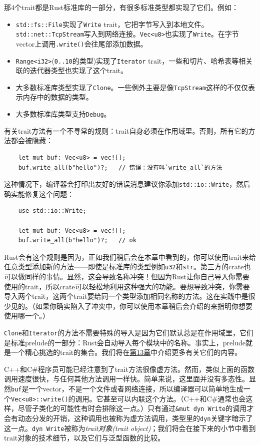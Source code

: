 那4个trait都是Rust标准库的一部分，有很多标准类型都实现了它们。例如：
\begin{itemize}
    \item \texttt{std::fs::File}实现了\texttt{Write} trait，它把字节写入到本地文件。\texttt{std::net::TcpStream}写入到网络连接。\texttt{Vec<u8>}也实现了\texttt{Write}。在字节vector上调用\texttt{.write()}会往尾部添加数据。
    \item \texttt{Range<i32>}(\texttt{0..10}的类型)实现了\texttt{Iterator} trait，一些和切片、哈希表等相关联的迭代器类型也实现了这个trait。
    \item 大多数标准库类型实现了\texttt{Clone}。一些例外主要是像\texttt{TcpStream}这样的不仅仅表示内存中的数据的类型。
    \item 大多数标准库类型支持\texttt{Debug}。
\end{itemize}

有关trait方法有一个不寻常的规则：trait自身必须在作用域里。否则，所有它的方法都会被隐藏：
\begin{verbatim}
    let mut buf: Vec<u8> = vec![];
    buf.write_all(b"hello")?;   // 错误：没有叫`write_all`的方法
\end{verbatim}

这种情况下，编译器会打印出友好的错误消息建议你添加\texttt{std::io::Write}，然后确实能修复这个问题：
\begin{verbatim}
    use std::io::Write;

    let mut buf: Vec<u8> = vec![];
    buf.write_all(b"hello")?;   // ok
\end{verbatim}

Rust会有这个规则是因为，正如我们稍后会在本章中看到的，你可以使用trait来给任意类型添加新的方法——即使是标准库的类型例如\texttt{u32}和\texttt{str}。第三方的crate也可以做同样的事情。显然，这会导致名称冲突！但因为Rust让你自己导入你需要使用的trait，所以crate可以轻松地利用这种强大的功能。要想导致冲突，你需要导入两个trait，这两个trait要给同一个类型添加相同名称的方法。这在实践中是很少见的。（如果你确实陷入了冲突中，你可以使用本章稍后会介绍的来指明你想要使用哪一个。）

\texttt{Clone}和\texttt{Iterator}的方法不需要特殊的导入是因为它们默认总是在作用域里，它们是标准prelude的一部分：Rust会自动导入每个模块中的名称。事实上，prelude就是一个精心挑选的trait的集合。我们将在\hyperref[ch13]{第13章}中介绍更多有关它们的内容。

C++和C\#程序员可能已经注意到了trait方法很像虚方法。然而，类似上面的函数调用速度很快，与任何其他方法调用一样快。简单来说，这里面并没有多态性。显然\texttt{buf}是一个vector，不是一个文件或者网络连接，所以编译器可以简单地生成一个\texttt{Vec<u8>::write()}的调用。它甚至可以内联这个方法。（C++和C\#通常也会这样，尽管子类化的可能性有时会排除这一点。）只有通过\texttt{\&mut dyn Write}的调用才会有动态分发的开销，这种调用也被称为虚方法调用，类型里的\texttt{dyn}关键字暗示了这一点。\texttt{dyn Write}被称为\emph{trait对象(trait object)}；我们将会在接下来的小节中看到trait对象的技术细节，以及它们与泛型函数的比较。


